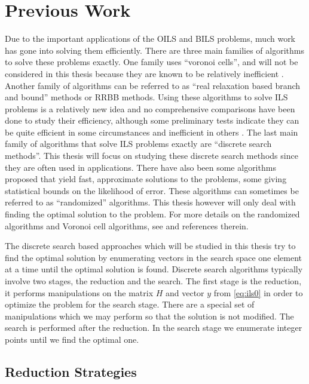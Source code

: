 \documentclass[12pt,Bold,letterpaper]{mcgilletdclass}
\newcommand{\vsp}{\vspace{\baselineskip}}
\begin{document}
\vsp \section{Previous Work} \label{sec:prevWork}
Due to the important applications of the OILS and BILS problems, much work has
gone into solving them efficiently. There are three main families of algorithms to solve these problems exactly. One family uses ``voronoi cells'', and will not be considered in this thesis because they are known to be relatively
inefficient \cite{HanPS11}. Another family of algorithms can be referred to as ``real
relaxation based branch and bound'' methods or RRBB methods. Using these algorithms to solve ILS
problems is a relatively new idea and no comprehensive comparisons have been
done to study their efficiency, although some preliminary tests indicate they
can be quite efficient in some circumstances and inefficient in others \cite{Ku11}. The last main family of algorithms
that solve ILS problems exactly are ``discrete search methods''. This thesis
will focus on studying these discrete search methods since they are often used in applications. There have also been some algorithms proposed that yield fast,
approximate solutions to the problems, some giving statistical bounds on the
likelihood of error. These algorithms can sometimes be referred to as
``randomized'' algorithms. This thesis however will only deal with finding the
optimal solution to the problem. For more details on the randomized algorithms
and Voronoi cell algorithms, see \cite{HanPS11} and references therein.

The discrete search based approaches which will be studied in this thesis try to find the optimal solution by enumerating vectors in the search space one element at a time until the optimal solution is found. Discrete search algorithms typically involve two stages, the reduction and the search. The first stage is the reduction, it performs manipulations on the matrix $H$ and vector $y$ from \eqref{eq:ils0} in order to optimize the problem for the search stage. There are a special set of manipulations which we may perform so that the solution is not modified. The search is performed after the reduction. In the search stage we enumerate integer points until we find the optimal one.

\vsp \subsection{Reduction Strategies} \label{subsec:Reductions}
\end{document}
